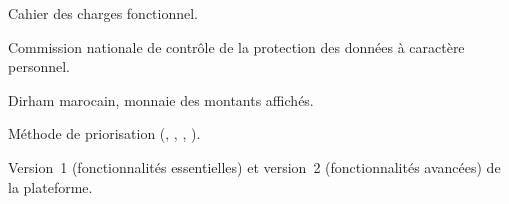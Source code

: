 
\begin{cdcdefinitions}[2.2cm]
  \item[CDCF] Cahier des charges fonctionnel.
  \item[CNDP] Commission nationale de contrôle de la protection des données à caractère personnel.
  \item[MAD] Dirham marocain, monnaie des montants affichés.
  \item[MoSCoW] Méthode de priorisation (\prioMust, \prioShould, \prioCould, \prioWont).
  \item[V1, V2] Version~1 (fonctionnalités essentielles) et version~2 (fonctionnalités avancées) de la plateforme.
\end{cdcdefinitions}
